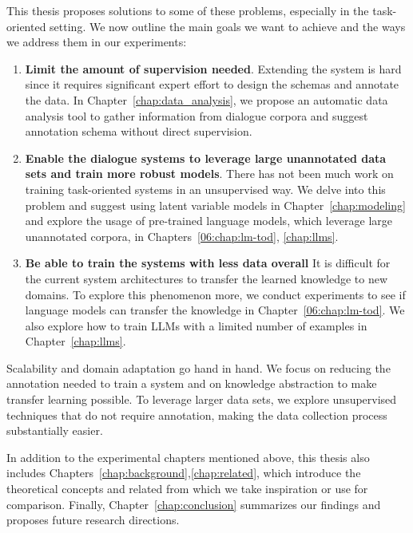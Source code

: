 This thesis proposes solutions to some of these problems, especially in the task-oriented setting.
We now outline the main goals we want to achieve and the ways we address them in our experiments:
\begin{enumerate}
    \item \textbf{Limit the amount of supervision needed}. Extending the system is hard since it requires significant expert effort to design the schemas and annotate the data. In Chapter~\ref{chap:data_analysis}, we propose an automatic data analysis tool to gather information from dialogue corpora and suggest annotation schema without direct supervision.
    \item \textbf{Enable the dialogue systems to leverage large unannotated data sets and train more robust models}. There has not been much work on training task-oriented systems in an unsupervised way. We delve into this problem and suggest using latent variable models in Chapter~\ref{chap:modeling} and explore the usage of pre-trained language models, which leverage large unannotated corpora, in Chapters~\ref{06:chap:lm-tod}, \ref{chap:llms}.
    \item \textbf{Be able to train the systems with less data overall} It is difficult for the current system architectures to transfer the learned knowledge to new domains. To explore this phenomenon more, we conduct experiments to see if language models can transfer the knowledge in Chapter~\ref{06:chap:lm-tod}. We also explore how to train LLMs with a limited number of examples in Chapter~\ref{chap:llms}.
\end{enumerate}

Scalability and domain adaptation go hand in hand.
We focus on reducing the annotation needed to train a system and on knowledge abstraction to make transfer learning possible.
To leverage larger data sets, we explore unsupervised techniques that do not require annotation, making the data collection process substantially easier.

In addition to the experimental chapters mentioned above, this thesis also includes Chapters~\ref{chap:background},\ref{chap:related}, which introduce the theoretical concepts and related from which we take inspiration or use for comparison.
Finally, Chapter~\ref{chap:conclusion} summarizes our findings and proposes future research directions.


